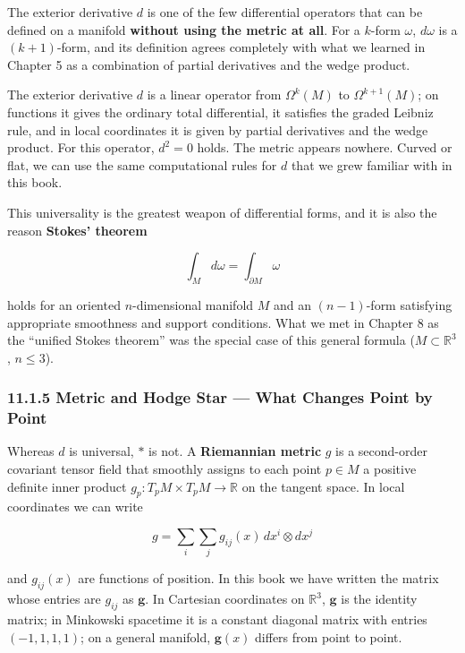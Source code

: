 The exterior derivative \(d\) is one of the few differential operators
that can be defined on a manifold \textbf{without using the metric at
all}. For a \(k\)-form \(\omega\), \(d\omega\) is a \((k+1)\)-form, and
its definition agrees completely with what we learned in Chapter 5 as a
combination of partial derivatives and the wedge product.

The exterior derivative \(d\) is a linear operator from \(\Omega^k(M)\)
to \(\Omega^{k+1}(M)\); on functions it gives the ordinary total
differential, it satisfies the graded Leibniz rule, and in local
coordinates it is given by partial derivatives and the wedge product.
For this operator, \(d^2 = 0\) holds. The metric appears nowhere. Curved
or flat, we can use the same computational rules for \(d\) that we grew
familiar with in this book.

This universality is the greatest weapon of differential forms, and it
is also the reason \textbf{Stokes' theorem}

\[\int_M d\omega = \int_{\partial M} \omega\]

holds for an oriented \(n\)-dimensional manifold \(M\) and an
\((n-1)\)-form satisfying appropriate smoothness and support conditions.
What we met in Chapter 8 as the ``unified Stokes theorem'' was the
special case of this general formula (\(M \subset \mathbb{R}^3\),
\(n \le 3\)).

\hypertarget{metric-and-hodge-star-what-changes-point-by-point}{%
\subsubsection{11.1.5 Metric and Hodge Star --- What Changes Point by
Point}\label{metric-and-hodge-star-what-changes-point-by-point}}

Whereas \(d\) is universal, \(\ast\) is not. A \textbf{Riemannian
metric} \(g\) is a second-order covariant tensor field that smoothly
assigns to each point \(p \in M\) a positive definite inner product
\(g_p: T_p M \times T_p M \to \mathbb{R}\) on the tangent space. In
local coordinates we can write

\[g = \sum_i\sum_j g_{ij}(x)\,dx^i \otimes dx^j\]

and \(g_{ij}(x)\) are functions of position. In this book we have
written the matrix whose entries are \(g_{ij}\) as \(\mathbf{g}\). In
Cartesian coordinates on \(\mathbb{R}^3\), \(\mathbf{g}\) is the
identity matrix; in Minkowski spacetime it is a constant diagonal matrix
with entries \((-1,1,1,1)\); on a general manifold, \(\mathbf{g}(x)\)
differs from point to point.

